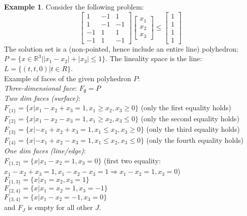 \documentclass[10pt]{article}
\def\R{\mathbb{R}}
\def\em{\emptyset}
\def\imp{\Rightarrow}
\theoremstyle{definition}
\newtheorem{example}{Example}[section]
\begin{document}
\begin{example}
	Consider the following problem:
	\begin{equation*}
		\begin{bmatrix}
			1  & -1 & 1  \\
			1  & -1 & -1 \\
			-1 & 1  & 1  \\
			-1 & 1  & -1
		\end{bmatrix}
		\begin{bmatrix}
			x_1 \\
			x_2 \\
			x_3
		\end{bmatrix}
		\le
		\begin{bmatrix}
			1 \\1\\1\\1
		\end{bmatrix}
	\end{equation*}
	The solution set is a (non-pointed, hence include an entire line)
	polyhedron: $P = \{x\in \R^3 \big| |x_1 - x_2| + |x_3| \le 1\}$.
	The lineality space is the line: $L = \{(t,t,0) | t\in R\}$.\\
	Example of faces of the given polyhedron $P$:\\
	\textit{Three-dimensional face}: $F_{\em} = P$\\
	\textit{Two dim faces (surface)}:\\
	$F_{\{1\}} = \{x | x_1 - x_2 + x_3 = 1, x_1 \ge x_2, x_3 \ge 0\}$ (only the first equality holds)\\
	$F_{\{2\}} = \{x | x_1 - x_2 - x_3 = 1, x_1 \ge x_2, x_3 \le 0\}$ (only the second equality holds)\\
	$F_{\{3\}} = \{x | -x_1 + x_2 + x_3 = 1, x_1 \le x_2, x_3 \ge 0\}$ (only the third equality holds)\\
	$F_{\{4\}} = \{x | -x_1 + x_2 - x_3 = 1, x_1 \le x_2, x_3 \le 0\}$ (only the fourth equality holds)\\
	\textit{One dim faces (line/edge)}:\\
	$F_{\{1,2\}} = \{x | x_1 - x_2 = 1, x_3 = 0\}$
	(first two equality: $x_1 - x_2 + x_3 = 1, x_1 - x_2 - x_3 = 1 \imp x_1 - x_2 = 1, x_3 = 0$)\\
	$F_{\{1,3\}} = \{x | x_1 = x_2, x_3 = 1\}$\\
	$F_{\{2,4\}} = \{x | x_1 = x_2 = 1, x_3 = -1\}$\\
	$F_{\{3,4\}} = \{x | x_1 - x_2 = -1, x_3 = 0\}$\\
	and $F_J$ is empty for all other $J$.
\end{example}
\end{document}
